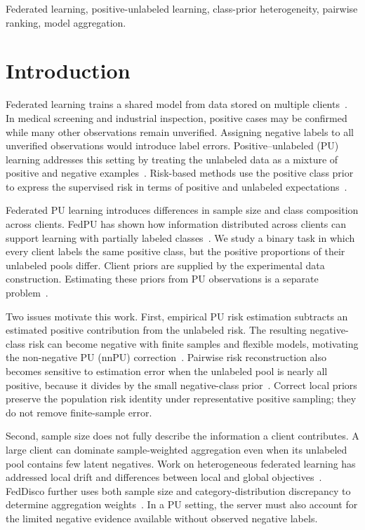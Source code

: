 \documentclass[lettersize,journal]{IEEEtran}
\begin{document}
\begin{IEEEkeywords}
Federated learning, positive-unlabeled learning, class-prior heterogeneity, pairwise ranking, model aggregation.
\end{IEEEkeywords}

\section{Introduction}

Federated learning trains a shared model from data stored on multiple clients~\cite{ref_fedavg,ref_fl_survey}. In medical screening and industrial inspection, positive cases may be confirmed while many other observations remain unverified. Assigning negative labels to all unverified observations would introduce label errors. Positive--unlabeled (PU) learning addresses this setting by treating the unlabeled data as a mixture of positive and negative examples~\cite{ref_pu_survey,ref_elkan}. Risk-based methods use the positive class prior to express the supervised risk in terms of positive and unlabeled expectations~\cite{ref_pu,ref_nnpu}.

Federated PU learning introduces differences in sample size and class composition across clients. FedPU has shown how information distributed across clients can support learning with partially labeled classes~\cite{ref_fedpu}. We study a binary task in which every client labels the same positive class, but the positive proportions of their unlabeled pools differ. Client priors are supplied by the experimental data construction. Estimating these priors from PU observations is a separate problem~\cite{ref_prior_estimation}.

Two issues motivate this work. First, empirical PU risk estimation subtracts an estimated positive contribution from the unlabeled risk. The resulting negative-class risk can become negative with finite samples and flexible models, motivating the non-negative PU (nnPU) correction~\cite{ref_nnpu}. Pairwise risk reconstruction also becomes sensitive to estimation error when the unlabeled pool is nearly all positive, because it divides by the small negative-class prior~\cite{ref_puauc}. Correct local priors preserve the population risk identity under representative positive sampling; they do not remove finite-sample error.

Second, sample size does not fully describe the information a client contributes. A large client can dominate sample-weighted aggregation even when its unlabeled pool contains few latent negatives. Work on heterogeneous federated learning has addressed local drift and differences between local and global objectives~\cite{ref_fedprox,ref_scaffold,ref_fednova,ref_feddyn}. FedDisco further uses both sample size and category-distribution discrepancy to determine aggregation weights~\cite{ref_feddisco}. In a PU setting, the server must also account for the limited negative evidence available without observed negative labels.
\end{document}

